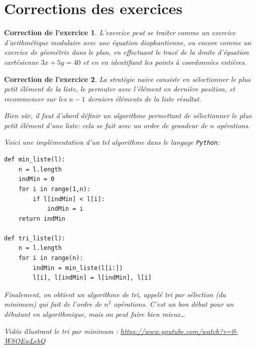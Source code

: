 \documentclass[12pt]{article}
\theoremstyle{break}
\newtheorem{cor}{Correction de l'exercice}
\begin{document}
\pagebreak


\section*{Corrections des exercices}

\begin{cor}
\textit{L'exercice peut se traiter comme un exercice d'arithmétique modulaire avec une équation diophantienne, ou encore comme un exercice de géométrie dans le plan, en effectuant le tracé de la droite d'équation cartésienne $3x + 5y = 40$ et en en identifiant les points à coordonnées entières.}
\end{cor}


\begin{cor}
La stratégie \textit{naïve} consiste en sélectionner le plus petit élément de la liste, le permuter avec l'élément en dernière position, et recommencer sur les $n-1$ derniers éléments de la liste résultat.

Bien sûr, il faut d'abord définir un algorithme permettant de sélectionner le plus petit élément d'une liste: cela se fait avec un ordre de grandeur de $n$ opérations.

Voici une implémentation d'un tel algorithme dans le langage \verb|Python|:

\begin{lstlisting}
def min_liste(l):
	n = l.length
	indMin = 0
    for i in range(1,n):
    	if l[indMin] < l[i]:
        	indMin = i
    return indMin

def tri_liste(l):
	n = l.length
    for i in range(n):
    	indMin = min_liste(l[i:])
        l[i], l[indMin] = l[indMin], l[i]
\end{lstlisting}

Finalement, on obtient un algorithme de tri, appelé \textit{tri par sélection (du minimum)} qui fait de l'ordre de $n^2$ opérations. C'est un bon début pour un débutant en algorithmique, mais on peut faire bien mieux\ldots

Vidéo illustrant le tri par minimum : \url{https://www.youtube.com/watch?v=0-W8OEwLebQ}
\end{cor}
\end{document}
